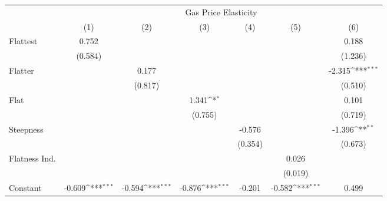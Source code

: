 {
\def\sym#1{\ifmmode^{#1}\else\(^{#1}\)\fi}
\begin{tabular}{l*{6}{c}}
\hline\hline
            &\multicolumn{6}{c}{Gas Price Elasticity}                                                                                           \\
            &\multicolumn{1}{c}{(1)}         &\multicolumn{1}{c}{(2)}         &\multicolumn{1}{c}{(3)}         &\multicolumn{1}{c}{(4)}         &\multicolumn{1}{c}{(5)}         &\multicolumn{1}{c}{(6)}         \\
\hline
Flattest    &       0.752         &                     &                     &                     &                     &       0.188         \\
            &     (0.584)         &                     &                     &                     &                     &     (1.236)         \\
[1em]
Flatter     &                     &       0.177         &                     &                     &                     &      -2.315\sym{***}\\
            &                     &     (0.817)         &                     &                     &                     &     (0.510)         \\
[1em]
Flat        &                     &                     &       1.341\sym{*}  &                     &                     &       0.101         \\
            &                     &                     &     (0.755)         &                     &                     &     (0.719)         \\
[1em]
Steepness   &                     &                     &                     &      -0.576         &                     &      -1.396\sym{**} \\
            &                     &                     &                     &     (0.354)         &                     &     (0.673)         \\
[1em]
Flatness Ind.&                     &                     &                     &                     &       0.026         &                     \\
            &                     &                     &                     &                     &     (0.019)         &                     \\
[1em]
Constant    &      -0.609\sym{***}&      -0.594\sym{***}&      -0.876\sym{***}&      -0.201         &      -0.582\sym{***}&       0.499         \\

\end{tabular}}
